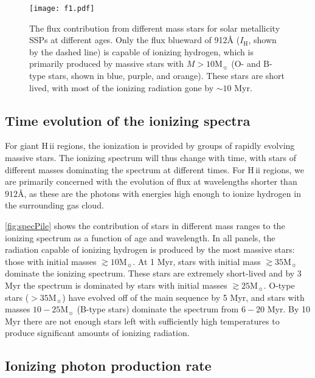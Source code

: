 \documentclass[twocolumn, tighten]{aastex61}
\newcommand{\Fig}[1]{\autoref{fig:#1}}
\newcommand\Msun{\ensuremath{\mathrm{M_{\sun}}}}
\newcommand{\hii}{H\,{\sc ii}\xspace}
\newcommand{\ang}{\ensuremath{\mbox{\AA}}}
\begin{document}
\begin{figure}[Ht!]
  \begin{center}
    \texttt{[image: f1.pdf]}
    \caption{The flux contribution from different mass stars for solar metallicity SSPs at different ages. Only the flux blueward of 912\ang{} ($I_{\mathrm{H}}$, shown by the dashed line) is capable of ionizing hydrogen, which is primarily produced by massive stars with $M > 10\Msun$  (O- and B-type stars, shown in blue, purple, and orange). These stars are short lived, with most of the ionizing radiation gone by $\sim 10$ Myr.}
    \label{fig:specPile}
  \end{center}
\end{figure}


\subsection{Time evolution of the ionizing spectra}\label{sec:spectra:age}

For giant \hii regions, the ionization is provided by groups of rapidly evolving massive stars. The ionizing spectrum will thus change with time, with stars of different masses dominating the spectrum at different times. For \hii regions, we are primarily concerned with the evolution of flux at wavelengths shorter than $912 \ang$, as these are the photons with energies high enough to ionize hydrogen in the surrounding gas cloud. 

\Fig{specPile} shows the contribution of stars in different mass ranges to the ionizing spectrum as a function of age and wavelength. In all panels, the radiation capable of ionizing hydrogen is produced by the most massive stars: those with initial masses $\gtrsim 10 \Msun$. At 1 Myr, stars with initial mass $\gtrsim35\Msun$ dominate the ionizing spectrum. These stars are extremely short-lived and by 3 Myr the spectrum is dominated by stars with initial masses $\gtrsim25\Msun$. O-type stars ($>35\Msun$) have evolved off of the main sequence by 5 Myr, and stars with masses $10-25\Msun$ (B-type stars) dominate the spectrum from $6-20$ Myr. By 10 Myr there are not enough stars left with sufficiently high temperatures to produce significant amounts of ionizing radiation.

\subsection{Ionizing photon production rate}\label{sec:spectra:Q}
\end{document}
